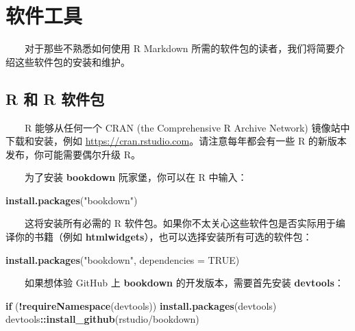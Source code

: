\documentclass[
  12pt,
]{krantz}
\newenvironment{Shaded}{\begin{snugshade}}{\end{snugshade}}
\newcommand{\AttributeTok}[1]{\textcolor[rgb]{0.13,0.29,0.53}{#1}}
\newcommand{\ConstantTok}[1]{\textcolor[rgb]{0.56,0.35,0.01}{#1}}
\newcommand{\ControlFlowTok}[1]{\textcolor[rgb]{0.13,0.29,0.53}{\textbf{#1}}}
\newcommand{\FunctionTok}[1]{\textcolor[rgb]{0.13,0.29,0.53}{\textbf{#1}}}
\newcommand{\NormalTok}[1]{#1}
\newcommand{\SpecialCharTok}[1]{\textcolor[rgb]{0.81,0.36,0.00}{\textbf{#1}}}
\newcommand{\StringTok}[1]{\textcolor[rgb]{0.31,0.60,0.02}{#1}}
\theoremstyle{definition}
\theoremstyle{definition}
\theoremstyle{definition}
\theoremstyle{definition}
\theoremstyle{remark}
\begin{document}
\cleardoublepage

\hypertarget{appendix-ux9644ux5f55}{%
\appendix {}}


\hypertarget{software-tools}{%
\chapter{软件工具}\label{software-tools}}

  对于那些不熟悉如何使用 R Markdown 所需的软件包的读者，我们将简要介绍这些软件包的安装和维护。

\hypertarget{r-ux548c-r-ux8f6fux4ef6ux5305}{%
\section{R 和 R 软件包}\label{r-ux548c-r-ux8f6fux4ef6ux5305}}

  R 能够从任何一个 CRAN (the Comprehensive R Archive Network) 镜像站中下载和安装，例如 \url{https://cran.rstudio.com}。请注意每年都会有一些 R 的新版本发布，你可能需要偶尔升级 R。

  为了安装 \textbf{bookdown} 阮家堡，你可以在 R 中输入：

\begin{Shaded}
\begin{Highlighting}[]
\FunctionTok{install.packages}\NormalTok{(}\StringTok{"bookdown"}\NormalTok{)}
\end{Highlighting}
\end{Shaded}

  这将安装所有必需的 R 软件包。如果你不太关心这些软件包是否实际用于编译你的书籍（例如 \textbf{htmlwidgets}），也可以选择安装所有可选的软件包：

\begin{Shaded}
\begin{Highlighting}[]
\FunctionTok{install.packages}\NormalTok{(}\StringTok{"bookdown"}\NormalTok{, }\AttributeTok{dependencies =} \ConstantTok{TRUE}\NormalTok{)}
\end{Highlighting}
\end{Shaded}

  如果想体验 GitHub 上 \textbf{bookdown} 的开发版本，需要首先安装 \textbf{devtools}：

\begin{Shaded}
\begin{Highlighting}[]
\ControlFlowTok{if}\NormalTok{ (}\SpecialCharTok{!}\FunctionTok{requireNamespace}\NormalTok{(}\StringTok{\textquotesingle{}devtools\textquotesingle{}}\NormalTok{)) }\FunctionTok{install.packages}\NormalTok{(}\StringTok{\textquotesingle{}devtools\textquotesingle{}}\NormalTok{)}
\NormalTok{devtools}\SpecialCharTok{::}\FunctionTok{install\_github}\NormalTok{(}\StringTok{\textquotesingle{}rstudio/bookdown\textquotesingle{}}\NormalTok{)}
\end{Highlighting}
\end{Shaded}
\end{document}
